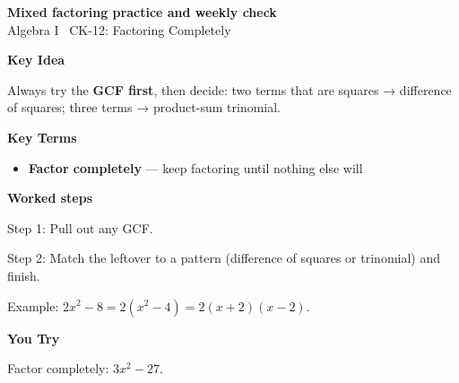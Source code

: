 \documentclass[12pt]{article}
\begin{document}
\begin{center}{\Large \textbf{Mixed factoring practice and weekly check}}\\[2pt]{\small Algebra I \textbar\ CK-12: Factoring Completely}\end{center}\vspace{0.25cm}

{\large\textbf{Key Idea}}\par\smallskip
Always try the \textbf{GCF first}, then decide: two terms that are squares → difference of squares; three terms → product-sum trinomial.\par


{\large\textbf{Key Terms}}\par\smallskip
\begin{itemize}[leftmargin=1.4em]
  \item \textbf{Factor completely} — keep factoring until nothing else will
\end{itemize}


{\large\textbf{Worked steps}}\par\smallskip
Step 1: Pull out any GCF.\par
Step 2: Match the leftover to a pattern (difference of squares or trinomial) and finish.\par
Example: $2x^2-8=2(x^2-4)=2(x+2)(x-2)$.\par


{\large\textbf{You Try}}\par\smallskip
Factor completely: $3x^2-27$.\par
\end{document}
